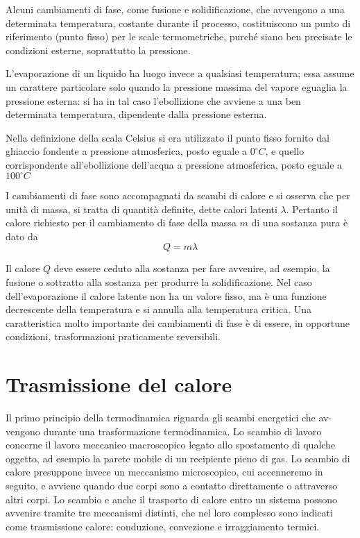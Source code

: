 \documentclass[class=book, crop=false, oneside, 12pt]{standalone}
\begin{document}
Alcuni cambiamenti di fase, come fusione e solidificazione, che avvengono a una determinata temperatura, costante durante il processo, costituiscono un punto di riferimento (punto fisso) per le scale termometriche, purché siano ben precisate le condizioni esterne, soprattutto la pressione.

L'evaporazione di un liquido ha luogo invece a qualsiasi temperatura; essa assume un carattere particolare solo quando la pressione massima del vapore eguaglia la pressione esterna: si ha in tal caso l'ebollizione che avviene a una ben determinata temperatura, dipendente dalla pressione esterna. 

Nella definizione della scala Celsius si era utilizzato il punto fisso fornito dal ghiaccio fondente a pressione atmosferica, posto eguale a \(0 ^{\circ} C\), e quello corrispondente all'ebollizione dell'acqua a pressione atmosferica, posto eguale a \(100 ^{\circ} C\)

I cambiamenti di fase sono accompagnati da scambi di calore e si osserva che per unità di massa, si tratta di quantità definite, dette calori latenti \(\lambda\). 
Pertanto il calore richiesto per il cambiamento di fase della massa \(m\) di una sostanza pura è dato da
\begin{equation}
    Q = m \lambda
\end{equation}

Il calore \(Q\) deve essere ceduto alla sostanza per fare avvenire, ad esempio, la fusione o sottratto alla sostanza per produrre la solidificazione.\newline
Nel caso dell'evaporazione il calore latente non ha un valore fisso, ma è una funzione decrescente della temperatura e si annulla alla temperatura critica.\newline
Una caratteristica molto importante dei cambiamenti di fase è di essere, in opportune condizioni, trasformazioni praticamente reversibili.

\section{Trasmissione del calore}

Il primo principio della termodinamica riguarda gli scambi energetici che av-vengono durante una trasformazione termodinamica. Lo scambio di lavoro concerne il lavoro meccanico macroscopico legato allo spostamento di qualche oggetto, ad esempio la parete mobile di un recipiente pieno di gas. 
Lo scambio di calore presuppone invece un meccanismo microscopico, cui accenneremo in seguito, e avviene quando due corpi sono a contatto direttamente o attraverso altri corpi.
Lo scambio e anche il trasporto di calore entro un sistema possono avvenire tramite tre meccanismi distinti, che nel loro complesso sono indicati come trasmissione calore: conduzione, convezione e irraggiamento termici.
\end{document}

